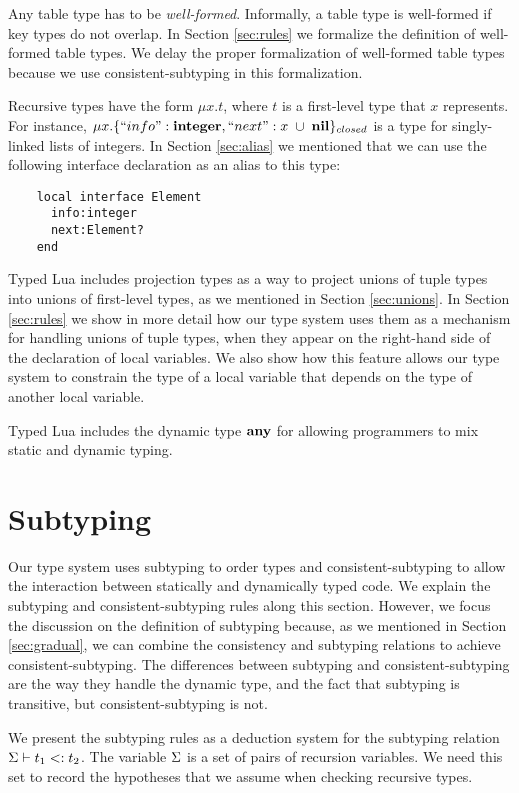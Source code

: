 Any table type has to be \emph{well-formed}.
Informally, a table type is well-formed if key types do not overlap.
In Section \ref{sec:rules} we formalize the definition of well-formed table types.
We delay the proper formalization of well-formed table types because we use
consistent-subtyping in this formalization.

Recursive types have the form $\mu x.t$,
where $t$ is a first-level type that $x$ represents.
For instance, $\mu x.\{``info":\mathbf{integer}, ``next":x \;\cup\; \mathbf{nil}\}_{closed}$
is a type for singly-linked lists of integers.
In Section \ref{sec:alias} we mentioned that we can use the following
interface declaration as an alias to this type:
\begin{verbatim}
    local interface Element
      info:integer
      next:Element?
    end
\end{verbatim}

Typed Lua includes projection types as a way to project
unions of tuple types into unions of first-level types,
as we mentioned in Section \ref{sec:unions}.
In Section \ref{sec:rules} we show in more detail how our type system
uses them as a mechanism for handling unions of tuple types,
when they appear on the right-hand side of the declaration of local variables.
We also show how this feature allows our type system to constrain
the type of a local variable that depends on the type of another local variable.

Typed Lua includes the dynamic type $\mathbf{any}$ for allowing programmers
to mix static and dynamic typing.

\section{Subtyping}
\label{sec:subtyping}

Our type system uses subtyping \citep{cardelli1984smi,abadi1996to} to order
types and consistent-subtyping \citep{siek2007objects,siek2013mutable}
to allow the interaction between statically and dynamically typed code.
We explain the subtyping and consistent-subtyping rules along this section.
However, we focus the discussion on the definition of subtyping because,
as we mentioned in Section \ref{sec:gradual}, we can combine the
consistency and subtyping relations to achieve consistent-subtyping.
The differences between subtyping and consistent-subtyping are the way
they handle the dynamic type, and the fact that subtyping is transitive,
but consistent-subtyping is not.

We present the subtyping rules as a deduction system for the
subtyping relation $\Sigma \vdash t_{1} <: t_{2}$.
The variable $\Sigma$ is a set of pairs of recursion variables.
We need this set to record the hypotheses that we assume when checking
recursive types.

